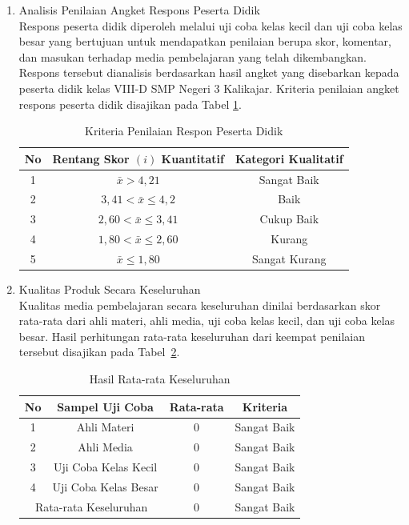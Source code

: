 \documentclass[12pt]{article}
\begin{document}
\begin{enumerate}
    \item Analisis Penilaian Angket Respons Peserta Didik\\
    \hspace*{1cm}Respons peserta didik diperoleh melalui uji coba kelas kecil dan uji coba kelas besar yang bertujuan untuk mendapatkan penilaian berupa skor, komentar, dan masukan terhadap media pembelajaran yang telah dikembangkan. Respons tersebut dianalisis berdasarkan hasil angket yang disebarkan kepada peserta didik kelas VIII-D SMP Negeri 3 Kalikajar. Kriteria penilaian angket respons peserta didik disajikan pada Tabel \ref{kriteriaresponsiswa}.
    \begin{table}[H]
        \centering
        \caption{Kriteria Penilaian Respon Peserta Didik}
        \label{kriteriaresponsiswa}
        \begin{tabular}{|c|c|c|}
            \hline
            \textbf{No} & \textbf{Rentang Skor \( (i) \) Kuantitatif} & \textbf{Kategori Kualitatif}\\
            \hline
            1 & \( \bar{x} > 4{,}21 \) & Sangat Baik\\
            2 & \( 3{,}41 < \bar{x} \leq 4{,}2 \) & Baik\\
            3 & \( 2{,}60 < \bar{x} \leq 3{,}41 \) & Cukup Baik\\
            4 & \( 1{,}80 < \bar{x} \leq 2{,}60 \) & Kurang\\
            5 & \( \bar{x} \leq 1{,80} \) & Sangat Kurang\\
            \hline 
        \end{tabular}
    \end{table}
    \item Kualitas Produk Secara Keseluruhan\\
    \hspace*{1cm}Kualitas media pembelajaran secara keseluruhan dinilai berdasarkan skor rata-rata dari ahli materi, ahli media, uji coba kelas kecil, dan uji coba kelas besar. Hasil perhitungan rata-rata keseluruhan dari keempat penilaian tersebut disajikan pada Tabel~\ref{ratakeseluruhan}.\\
    \begin{table}[H]
        \centering
        \caption{Hasil Rata-rata Keseluruhan}
        \label{ratakeseluruhan}
        \begin{tabular}{|c|c|c|c|}
            \hline
            \textbf{No} & \textbf{Sampel Uji Coba} & \textbf{Rata-rata} & \textbf{Kriteria}\\
            \hline
            1 & Ahli Materi & 0 & Sangat Baik\\
            2 & Ahli Media & 0 & Sangat Baik\\
            3 & Uji Coba Kelas Kecil & 0 & Sangat Baik\\
            4 & Uji Coba Kelas Besar & 0 & Sangat Baik\\
            \hline
            \multicolumn{2}{|c|}{Rata-rata Keseluruhan} & 0 & Sangat Baik\\
            \hline
            

\end{tabular}
\end{table}
\end{enumerate}
\end{document}
